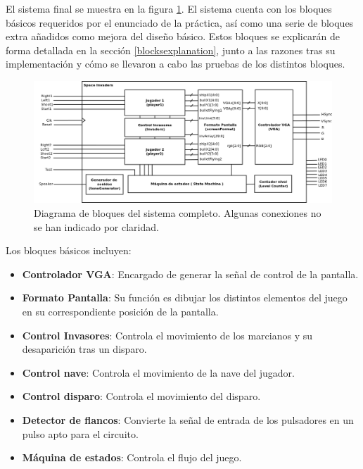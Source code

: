 \label{generalBehavior}

El sistema final se muestra en la figura \ref{fig:spaceinvblock}. El sistema cuenta con los bloques básicos requeridos por el enunciado de la práctica, así como una serie de bloques extra añadidos como mejora del diseño básico. Estos bloques se explicarán de forma detallada en la sección \ref{blocksexplanation}, junto a las razones tras su implementación y cómo se llevaron a cabo las pruebas de los distintos bloques.

\begin{figure}[H]
	\centering
	\includegraphics[width=\textwidth]{spaceinvaders.png}
	\caption{Diagrama de bloques del sistema completo. Algunas conexiones no se han indicado por claridad. }\label{fig:spaceinvblock}
\end{figure}

Los bloques básicos incluyen:
\begin{itemize}
	\item {\bfseries Controlador VGA}: Encargado de generar la señal de control de la pantalla.
	\item {\bfseries Formato Pantalla}: Su función es dibujar los distintos elementos del juego en su correspondiente posición de la pantalla.
	\item {\bfseries Control Invasores}: Controla el movimiento de los marcianos y su desaparición tras un disparo.
	\item {\bfseries Control nave}: Controla el movimiento de la nave del jugador.
	\item {\bfseries Control disparo}: Controla el movimiento del disparo.
	\item {\bfseries Detector de flancos}: Convierte la señal de entrada de los pulsadores en un pulso apto para el circuito.
	\item {\bfseries Máquina de estados}: Controla el flujo del juego.
\end{itemize}

